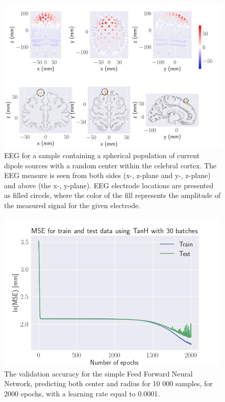 \documentclass[a4paper, UKenglish, 11pt]{uiomaster}
\begin{document}
\begin{figure}[!htb]
    \centering
    \includegraphics[width=\linewidth]{../Code/plots/finals/new_dipole_area_reduced_0.pdf}
    \caption{EEG for a sample containing a spherical population of current dipole sources with a random center within the celebral cortex. The EEG measure is seen from both sides (x-, z-plane and y-, z-plane) and above (the x-, y-plane). EEG electrode locations are presented as filled circels, where the color of the fill represents the amplitude of the measured signal for the given electrode.}
    \label{fig:dipole_area}
\end{figure}

\begin{figure}[!htb]
    \centering
    \includegraphics[width=\linewidth]{../Code/plots/finals/normalized_dipole_area.png}
    \caption{The validation accuracy for the simple Feed Forward Neural Network, predicting both center and radius for 10 000 samples, for 2000 epochs, with a learning rate equal to 0.0001.}
    \label{fig:dipole_area_result}
\end{figure}
\end{document}
